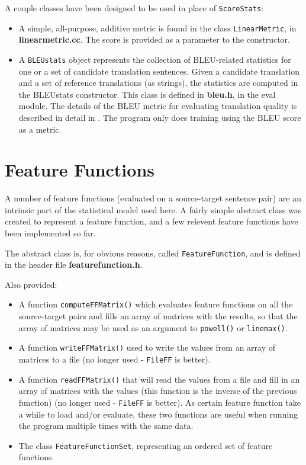 \documentclass[12pt]{amsart}
\newcommand{\file}{\textbf} \newcommand{\url}{\underline}
\newcommand{\code}[1]{{\small \texttt{#1}}}
\begin{document}
A couple classes have been designed to be used in place of \code{ScoreStats}:
\begin{itemize}
\item A simple, all-purpose, additive metric is found in the class
      \code{LinearMetric}, in \file{linearmetric.cc}.
  The score is provided as a parameter to the constructor.
\item A \code{BLEUstats} object represents the collection of BLEU-related
      statistics for one or a set of candidate translation sentences.
  Given a candidate translation and a set of reference translations (as
  strings), the statistics are computed in the BLEUstats constructor.  This
  class is defined in \file{bleu.h}, in the eval module.  The details of the
  BLEU metric for evaluating translation quality is described in detail in
  \cite{bleu}.  The program only does training using the BLEU score as a
  metric.
\end{itemize}

\section*{Feature Functions}

A number of feature functions (evaluated on a source-target sentence pair) are
an intrinsic part of the statistical model used here.  A fairly simple abstract
class was created to represent a feature function, and a few relevent feature
functions have been implemented so far.

The abstract class is, for obvious reasons, called \code{FeatureFunction}, and
is defined in the header file \file{featurefunction.h}.

Also provided:
\begin{itemize}
\item A function \code{computeFFMatrix()} which evaluates feature functions on
      all the source-target pairs and fills an array of matrices with the
      results, so that the array of matrices may be used as an argument to
      \code{powell()} or \code{linemax()}.
\item A function \code{writeFFMatrix()} used to write the values from an array
      of matrices to a file (no longer used - \code{FileFF} is better).
\item A function \code{readFFMatrix()} that will read the values from a file
      and fill in an array of matrices with the values (this function is the
      inverse of the previous function) (no longer used - \code{FileFF} is
      better).
  As certain feature function take a while to load and/or evaluate, these two
  functions are useful when running the program multiple times with the same
  data.
\item The class \code{FeatureFunctionSet}, representing an ordered set of
      feature functions.
\end{itemize}
\end{document}

